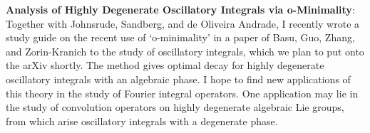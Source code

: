 \documentclass[11pt]{article}
\begin{document}



{\bf Analysis of Highly Degenerate Oscillatory Integrals via o-Minimality}: Together with Johnsrude, Sandberg, and de Oliveira Andrade, I recently wrote a study guide on the recent use of `o-minimality' in a paper of Basu, Guo, Zhang, and Zorin-Kranich \cite{BasuGuoZhangZorinKranich} to the study of oscillatory integrals, which we plan to put onto the arXiv shortly. The method gives optimal decay for highly degenerate oscillatory integrals with an algebraic phase. I hope to find new applications of this theory in the study of Fourier integral operators. One application may lie in the study of convolution operators on highly degenerate algebraic Lie groups, from which arise oscillatory integrals with a degenerate phase.

\pagebreak[4]
\end{document}
